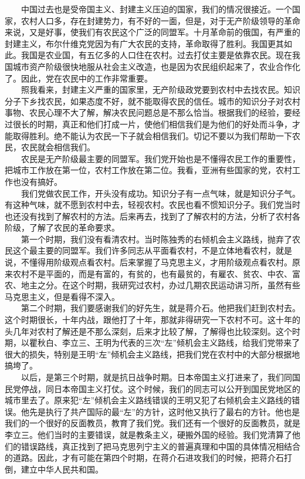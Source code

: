 \documentclass[cn,11pt,chinese]{elegantbook}
\begin{document}
　　中国过去也是受帝国主义、封建主义压迫的国家，我们的情况很接近。一个国家，农村人口多，存在封建势力，有不好的一面，但是，对于无产阶级领导的革命来说，又是好事，使我们有农民这个广泛的同盟军。十月革命前的俄国，有严重的封建主义，布尔什维克党因为有广大农民的支持，革命取得了胜利。我国更其如此。我国是农业国，有五亿多的人口住在农村。过去打仗主要是依靠农民。现在我国城市资产阶级很快地服从社会主义改造，也是因为农民组织起来了，农业合作化了。因此，党在农民中的工作非常重要。\\
　　照我看来，封建主义严重的国家里，无产阶级政党要到农村中去找农民。知识分子下乡找农民，如果态度不好，就不能取得农民的信任。城市的知识分子对农村事物、农民心理不大了解，解决农民问题总是不那么恰当。根据我们的经验，要经过很长的时期，真正和他们打成一片，使他们相信我们是为他们的好处而斗争，才能取得胜利。绝不能认为农民一下子就会相信我们。切记不要以为我们帮助一下农民，农民就会相信我们。\\
　　农民是无产阶级最主要的同盟军。我们党开始也是不懂得农民工作的重要性，把城市工作放在第一位，农村工作放在第二位。我看，亚洲有些国家的党，农村工作也没有搞好。\\
　　我们党做农民工作，开头没有成功。知识分子有一点气味，就是知识分子气。有这种气味，就不愿到农村中去，轻视农村。农民也看不惯知识分子。我们党当时也还没有找到了解农村的方法。后来再去，找到了了解农村的方法，分析了农村各阶级，了解了农民的革命要求。\\
　　第一个时期，我们没有看清农村。当时陈独秀的右倾机会主义路线，抛弃了农民这个最主要的同盟军。我们许多同志从平面看农村，不是立体地看农村，就是说，不懂得用阶级观点看农村。后来掌握了马克思主义，才用阶级观点看农村。原来农村不是平面的，而是有富的，有贫的，也有最贫的，有雇农、贫农、中农、富农、地主之分。在这个时期，我研究过农村，办过几期农民运动讲习所，虽然有些马克思主义，但是看得不深入。\\
　　第二个时期，我们要感谢我们的好先生，就是蒋介石。他把我们赶到农村去。这个时期很长，十年内战，跟他打了十年，那就非得研究一下农村不可。这十年的头几年对农村了解还是不那么深刻，后来才比较了解，了解得也比较深刻。这个时期，以瞿秋白、李立三、王明为代表的三次“左”倾机会主义路线，给我们党带来了很大的损失，特别是王明“左”倾机会主义路线，把我们党在农村中的大部分根据地搞垮了。\\
　　以后，是第三个时期，就是抗日战争时期。日本帝国主义打进来了，我们同国民党停战，同日本帝国主义打仗。这个时候，我们的同志可以公开到国民党地区的城市里去了。原来犯“左”倾机会主义路线错误的王明又犯了右倾机会主义路线的错误。他先是执行了共产国际的最“左”的方针，这时他又执行了最右的方针。他也是我们的一个很好的反面教员，教育了我们党。我们还有一个很好的反面教员，就是李立三。他们当时的主要错误，就是教条主义，硬搬外国的经验。我们党清算了他们的错误路线，真正找到了把马克思列宁主义的普遍真理和中国的具体情况相结合的道路。因此，才有可能在第四个时期，在蒋介石进攻我们的时候，把蒋介石打倒，建立中华人民共和国。\\
\end{document}
